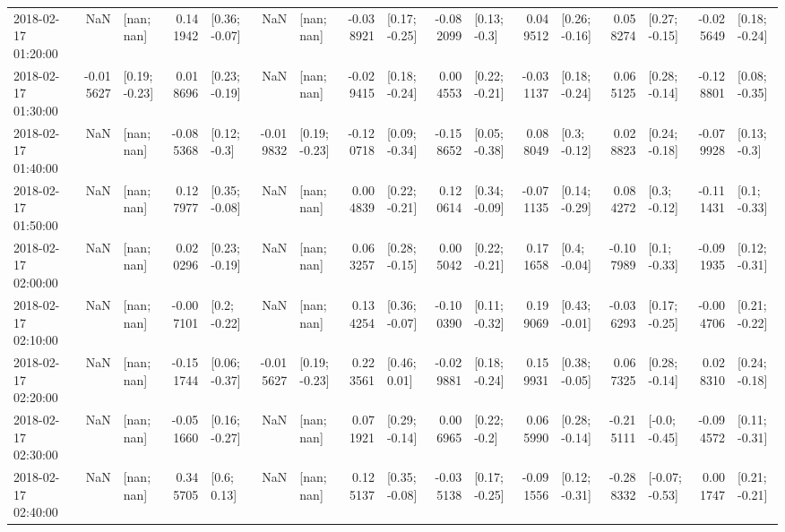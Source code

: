 \begin{tabular}{lrlrlrlrlrlrlrlrl}
2018-02-17 01:20:00 &       NaN &      [nan; nan] &  0.141942 &   [0.36; -0.07] &       NaN &      [nan; nan] & -0.038921 &   [0.17; -0.25] & -0.082099 &    [0.13; -0.3] &  0.049512 &   [0.26; -0.16] &  0.058274 &   [0.27; -0.15] & -0.025649 &   [0.18; -0.24] \\
2018-02-17 01:30:00 & -0.015627 &   [0.19; -0.23] &  0.018696 &   [0.23; -0.19] &       NaN &      [nan; nan] & -0.029415 &   [0.18; -0.24] &  0.004553 &   [0.22; -0.21] & -0.031137 &   [0.18; -0.24] &  0.065125 &   [0.28; -0.14] & -0.128801 &   [0.08; -0.35] \\
2018-02-17 01:40:00 &       NaN &      [nan; nan] & -0.085368 &    [0.12; -0.3] & -0.019832 &   [0.19; -0.23] & -0.120718 &   [0.09; -0.34] & -0.158652 &   [0.05; -0.38] &  0.088049 &    [0.3; -0.12] &  0.028823 &   [0.24; -0.18] & -0.079928 &    [0.13; -0.3] \\
2018-02-17 01:50:00 &       NaN &      [nan; nan] &  0.127977 &   [0.35; -0.08] &       NaN &      [nan; nan] &  0.004839 &   [0.22; -0.21] &  0.120614 &   [0.34; -0.09] & -0.071135 &   [0.14; -0.29] &  0.084272 &    [0.3; -0.12] & -0.111431 &    [0.1; -0.33] \\
2018-02-17 02:00:00 &       NaN &      [nan; nan] &  0.020296 &   [0.23; -0.19] &       NaN &      [nan; nan] &  0.063257 &   [0.28; -0.15] &  0.005042 &   [0.22; -0.21] &  0.171658 &    [0.4; -0.04] & -0.107989 &    [0.1; -0.33] & -0.091935 &   [0.12; -0.31] \\
2018-02-17 02:10:00 &       NaN &      [nan; nan] & -0.007101 &    [0.2; -0.22] &       NaN &      [nan; nan] &  0.134254 &   [0.36; -0.07] & -0.100390 &   [0.11; -0.32] &  0.199069 &   [0.43; -0.01] & -0.036293 &   [0.17; -0.25] & -0.004706 &   [0.21; -0.22] \\
2018-02-17 02:20:00 &       NaN &      [nan; nan] & -0.151744 &   [0.06; -0.37] & -0.015627 &   [0.19; -0.23] &  0.223561 &    [0.46; 0.01] & -0.029881 &   [0.18; -0.24] &  0.159931 &   [0.38; -0.05] &  0.067325 &   [0.28; -0.14] &  0.028310 &   [0.24; -0.18] \\
2018-02-17 02:30:00 &       NaN &      [nan; nan] & -0.051660 &   [0.16; -0.27] &       NaN &      [nan; nan] &  0.071921 &   [0.29; -0.14] &  0.006965 &    [0.22; -0.2] &  0.065990 &   [0.28; -0.14] & -0.215111 &   [-0.0; -0.45] & -0.094572 &   [0.11; -0.31] \\
2018-02-17 02:40:00 &       NaN &      [nan; nan] &  0.345705 &     [0.6; 0.13] &       NaN &      [nan; nan] &  0.125137 &   [0.35; -0.08] & -0.035138 &   [0.17; -0.25] & -0.091556 &   [0.12; -0.31] & -0.288332 &  [-0.07; -0.53] &  0.001747 &   [0.21; -0.21] \\

\end{tabular}
